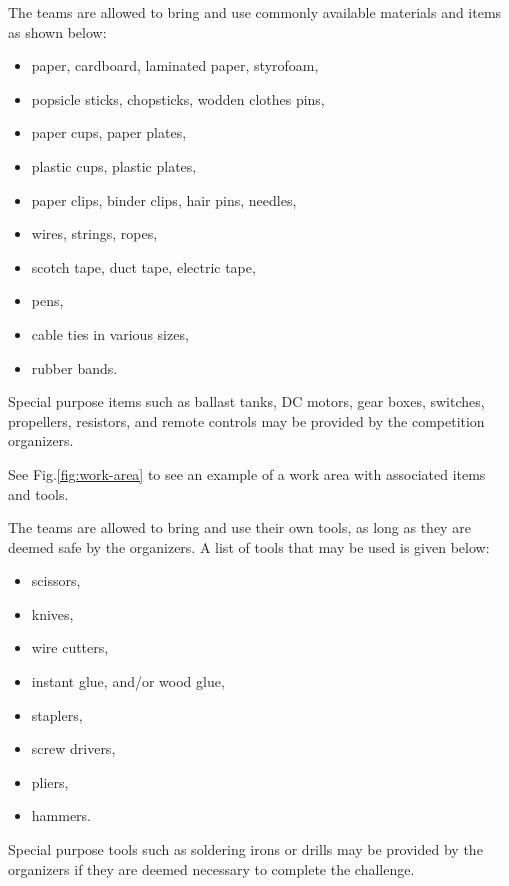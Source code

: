 \documentclass[12pt]{hurocup}
\begin{document}
\begin{decisions}

\item \label{dec-items} The teams are allowed to bring and use
  commonly available materials and items as shown below:
  \begin{itemize}
    \item paper, cardboard, laminated paper, styrofoam, 
    \item popsicle sticks, chopsticks, wodden clothes pins,
    \item paper cups, paper plates,
    \item plastic cups, plastic plates,
    \item paper clips, binder clips, hair pins, needles,
    \item wires, strings, ropes, 
    \item scotch tape, duct tape, electric tape,
    \item pens,
    \item cable ties in various sizes,
    \item rubber bands.
  \end{itemize}

  Special purpose items such as ballast tanks, DC motors, gear boxes,
  switches, propellers, resistors, and remote controls may be provided
  by the competition organizers.
      
  See Fig.\ref{fig:work-area} to see an example of a work area with
  associated items and tools.

\item \label{dec-tools} The teams are allowed to bring and use their
  own tools, as long as they are deemed safe by the
  organizers. A list of tools that may be used is given below:
  \begin{itemize}
    \item scissors, 
    \item knives, 
    \item wire cutters,
    \item instant glue, and/or wood glue, 
    \item staplers,
    \item screw drivers,
    \item pliers,
    \item hammers.
  \end{itemize}
  
  Special purpose tools such as soldering irons or drills may be
  provided by the organizers if they are deemed necessary to complete
  the challenge.


\end{decisions}
\end{document}
